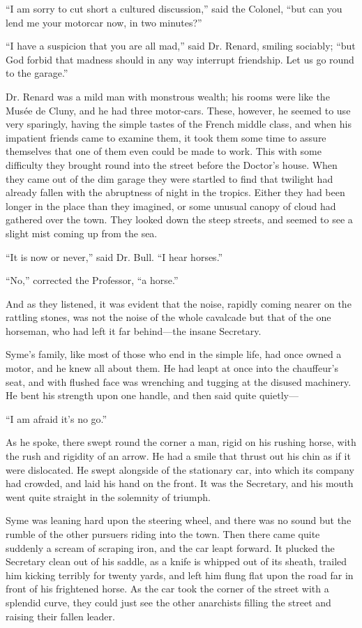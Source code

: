 \documentclass{book}
\begin{document}
“I am sorry to cut short a cultured discussion,” said the Colonel, “but can you lend me your motorcar now, in two minutes?”

“I have a suspicion that you are all mad,” said Dr. Renard, smiling sociably; “but God forbid that madness should in any way interrupt friendship. Let us go round to the garage.”

Dr. Renard was a mild man with monstrous wealth; his rooms were like the Musée de Cluny, and he had three motor-cars. These, however, he seemed to use very sparingly, having the simple tastes of the French middle class, and when his impatient friends came to examine them, it took them some time to assure themselves that one of them even could be made to work. This with some difficulty they brought round into the street before the Doctor’s house. When they came out of the dim garage they were startled to find that twilight had already fallen with the abruptness of night in the tropics. Either they had been longer in the place than they imagined, or some unusual canopy of cloud had gathered over the town. They looked down the steep streets, and seemed to see a slight mist coming up from the sea.

“It is now or never,” said Dr. Bull. “I hear horses.”

“No,” corrected the Professor, “a horse.”

And as they listened, it was evident that the noise, rapidly coming nearer on the rattling stones, was not the noise of the whole cavalcade but that of the one horseman, who had left it far behind—the insane Secretary.

Syme’s family, like most of those who end in the simple life, had once owned a motor, and he knew all about them. He had leapt at once into the chauffeur’s seat, and with flushed face was wrenching and tugging at the disused machinery. He bent his strength upon one handle, and then said quite quietly—

“I am afraid it’s no go.”

As he spoke, there swept round the corner a man, rigid on his rushing horse, with the rush and rigidity of an arrow. He had a smile that thrust out his chin as if it were dislocated. He swept alongside of the stationary car, into which its company had crowded, and laid his hand on the front. It was the Secretary, and his mouth went quite straight in the solemnity of triumph.

Syme was leaning hard upon the steering wheel, and there was no sound but the rumble of the other pursuers riding into the town. Then there came quite suddenly a scream of scraping iron, and the car leapt forward. It plucked the Secretary clean out of his saddle, as a knife is whipped out of its sheath, trailed him kicking terribly for twenty yards, and left him flung flat upon the road far in front of his frightened horse. As the car took the corner of the street with a splendid curve, they could just see the other anarchists filling the street and raising their fallen leader.
\end{document}

